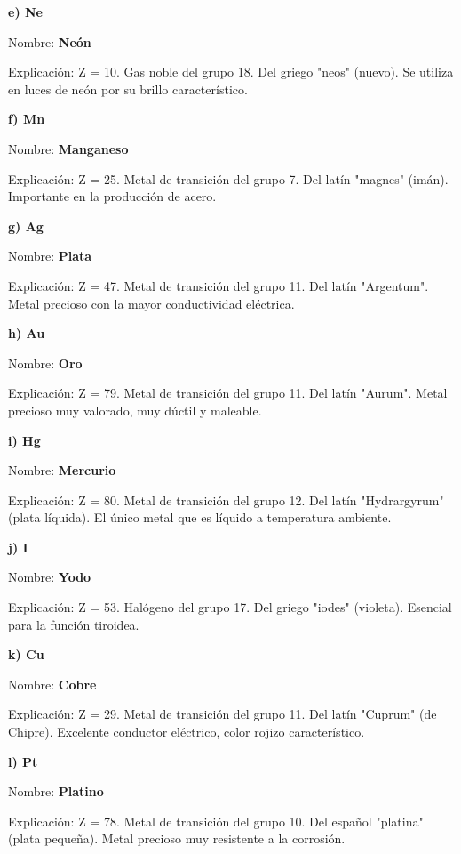 \begin{exercise}
\begin{solu}
        \textbf{e) Ne}

        Nombre: \textbf{Neón}

        Explicación: Z = 10. Gas noble del grupo 18. Del griego "neos" (nuevo). Se utiliza en luces de neón por su brillo característico.

        \textbf{f) Mn}

        Nombre: \textbf{Manganeso}

        Explicación: Z = 25. Metal de transición del grupo 7. Del latín "magnes" (imán). Importante en la producción de acero.

        \textbf{g) Ag}

        Nombre: \textbf{Plata}

        Explicación: Z = 47. Metal de transición del grupo 11. Del latín "Argentum". Metal precioso con la mayor conductividad eléctrica.

        \textbf{h) Au}

        Nombre: \textbf{Oro}

        Explicación: Z = 79. Metal de transición del grupo 11. Del latín "Aurum". Metal precioso muy valorado, muy dúctil y maleable.

        \textbf{i) Hg}

        Nombre: \textbf{Mercurio}

        Explicación: Z = 80. Metal de transición del grupo 12. Del latín "Hydrargyrum" (plata líquida). El único metal que es líquido a temperatura ambiente.

        \textbf{j) I}

        Nombre: \textbf{Yodo}

        Explicación: Z = 53. Halógeno del grupo 17. Del griego "iodes" (violeta). Esencial para la función tiroidea.

        \textbf{k) Cu}

        Nombre: \textbf{Cobre}

        Explicación: Z = 29. Metal de transición del grupo 11. Del latín "Cuprum" (de Chipre). Excelente conductor eléctrico, color rojizo característico.

        \textbf{l) Pt}

        Nombre: \textbf{Platino}

        Explicación: Z = 78. Metal de transición del grupo 10. Del español "platina" (plata pequeña). Metal precioso muy resistente a la corrosión.


\end{solu}
\end{exercise}

